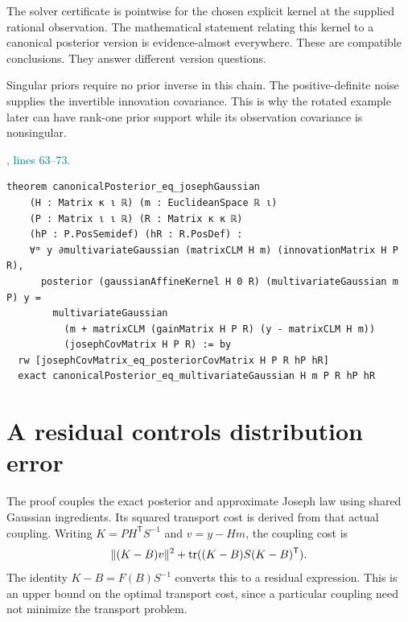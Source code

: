 \documentclass[11pt]{article}\usepackage{needspace}\renewcommand{\paperkind}{Lean companion}\setlength{\parskip}{0.35em}
\begin{document}
The solver certificate is pointwise for the chosen explicit kernel at the supplied rational observation. The mathematical statement relating this kernel to a canonical posterior version is evidence-almost everywhere. These are compatible conclusions. They answer different version questions.

Singular priors require no prior inverse in this chain. The positive-definite noise supplies the invertible innovation covariance. This is why the rotated example later can have rank-one prior support while its observation covariance is nonsingular.



{\small\textcolor{teal}{, lines 63--73.}\par}

\begin{lstlisting}[style=BayesSource]
theorem canonicalPosterior_eq_josephGaussian
    (H : Matrix κ ι ℝ) (m : EuclideanSpace ℝ ι)
    (P : Matrix ι ι ℝ) (R : Matrix κ κ ℝ)
    (hP : P.PosSemidef) (hR : R.PosDef) :
    ∀ᵐ y ∂multivariateGaussian (matrixCLM H m) (innovationMatrix H P R),
      posterior (gaussianAffineKernel H 0 R) (multivariateGaussian m P) y =
        multivariateGaussian
          (m + matrixCLM (gainMatrix H P R) (y - matrixCLM H m))
          (josephCovMatrix H P R) := by
  rw [josephCovMatrix_eq_posteriorCovMatrix H P R hP hR]
  exact canonicalPosterior_eq_multivariateGaussian H m P R hP hR
\end{lstlisting}

\section{A residual controls distribution error}

The proof couples the exact posterior and approximate Joseph law using shared Gaussian ingredients. Its squared transport cost is derived from that actual coupling. Writing $K=PH^{\mathsf T}S^{-1}$ and $v=y-Hm$, the coupling cost is
\[
 \|(K-B)v\|^2+\operatorname{tr}((K-B)S(K-B)^{\mathsf T}).
\]
The identity $K-B=F(B)S^{-1}$ converts this to a residual expression. This is an upper bound on the optimal transport cost, since a particular coupling need not minimize the transport problem.
\end{document}
